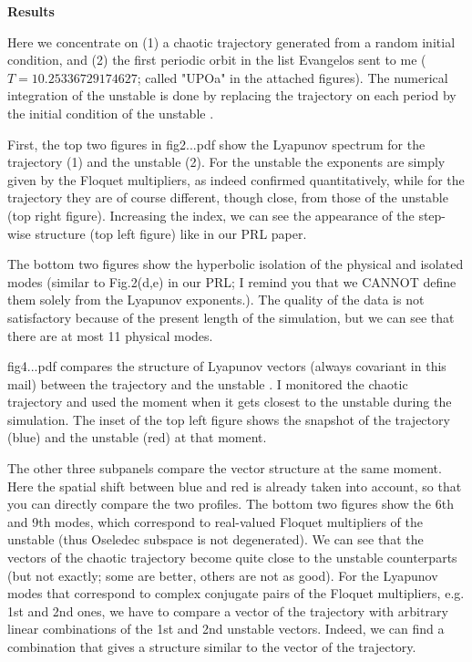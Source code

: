 \begin{description}
\textbf{Results}

Here we concentrate on (1) a chaotic trajectory generated from a random
initial condition, and (2) the first periodic orbit in the list
Evangelos sent to me ($T=10.25336729174627$; called "UPOa" in the attached
figures). The numerical integration of the {unstable \po} is done by replacing the
trajectory on each period by the initial condition of the {unstable \po}.

First, the top two figures in fig2...pdf show the Lyapunov spectrum for
the trajectory (1) and the {unstable \po} (2). For the {unstable \po} the exponents are simply
given by the Floquet multipliers, as indeed confirmed quantitatively,
while for the trajectory they are of course different, though close,
from those of the {unstable \po} (top right figure). Increasing the index, we can
see the appearance of the step-wise structure (top left figure) like in
our PRL paper.

The bottom two figures show the hyperbolic isolation of the physical and
isolated modes (similar to Fig.2(d,e) in our PRL; I remind you that we
CANNOT define them solely from the Lyapunov exponents.). The quality of
the data is not satisfactory because of the present length of the
simulation, but we can see that there are at most 11 physical modes.


fig4...pdf compares the structure of Lyapunov vectors (always covariant
in this mail) between the trajectory and the {unstable \po}. I monitored the
chaotic trajectory and used the moment when it gets closest to the {unstable \po}
during the simulation. The inset of the top left figure shows the
snapshot of the trajectory (blue) and the {unstable \po} (red) at that moment.

The other three subpanels compare the vector structure at the same
moment. Here the spatial shift between blue and red is already taken
into account, so that you can directly compare the two profiles. The
bottom two figures show the 6th and 9th modes, which correspond to
real-valued Floquet multipliers of the {unstable \po} (thus Oseledec subspace is
not degenerated). We can see that the vectors of the chaotic trajectory
become quite close to the {unstable \po} counterparts (but not exactly; some are
better, others are not as good). For the Lyapunov modes that correspond
to complex conjugate pairs of the Floquet multipliers, e.g. 1st and 2nd
ones, we have to compare a vector of the trajectory with arbitrary
linear combinations of the 1st and 2nd {unstable \po} vectors. Indeed, we can find
a combination that gives a structure similar to the vector of the
trajectory.


\end{description}
